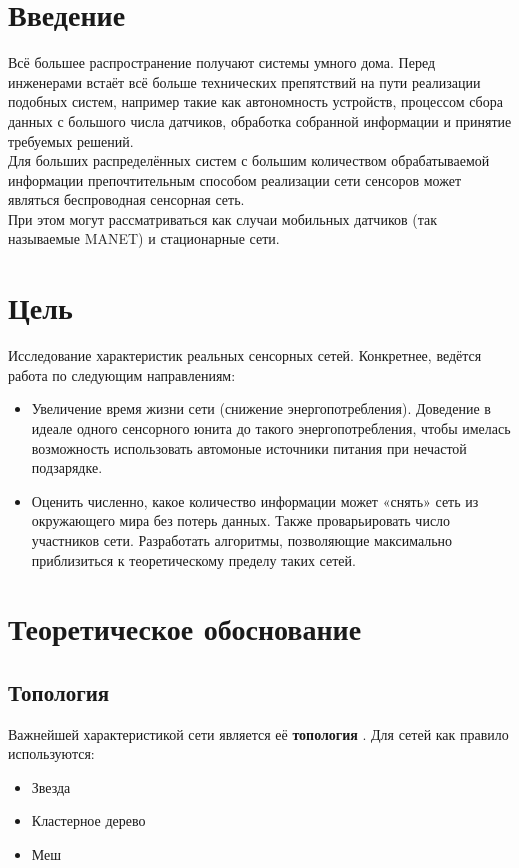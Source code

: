 \documentclass[bibliography=totocnumbered]{scrartcl}
\begin{document}
\tableofcontents

\newpage 

\section{Введение}
Всё большее распространение получают системы умного дома. Перед инженерами встаёт всё больше технических препятствий на пути реализации подобных систем, например такие как автономность устройств, процессом сбора данных с большого числа датчиков, обработка собранной информации и принятие требуемых решений. \\
Для больших распределённых систем с большим количеством обрабатываемой информации препочтительным способом реализации сети сенсоров может являться беспроводная сенсорная сеть. \\ 
При этом могут рассматриваться как случаи мобильных датчиков (так называемые MANET) и стационарные сети.

\section{Цель}

Исследование характеристик реальных сенсорных сетей. Конкретнее, ведётся работа по следующим направлениям:

\begin{itemize}

\item Увеличение время жизни сети (снижение энергопотребления). Доведение в идеале одного сенсорного юнита до такого энергопотребления, чтобы имелась возможность использовать автомоные источники питания при нечастой подзарядке.

\item Оценить численно, какое количество информации может «снять» сеть из окружающего мира без потерь данных. Также проварьировать число участников сети. Разработать алгоритмы, позволяющие максимально приблизиться к теоретическому пределу таких сетей.

\end{itemize}

\section{Теоретическое обоснование}

\subsection{Топология}
Важнейшей характеристикой сети является её \textbf{топология} . Для сетей как правило используются:
\begin{itemize}
	\item Звезда
	\item Кластерное дерево
	\item Меш
\end{itemize}
\end{document}
